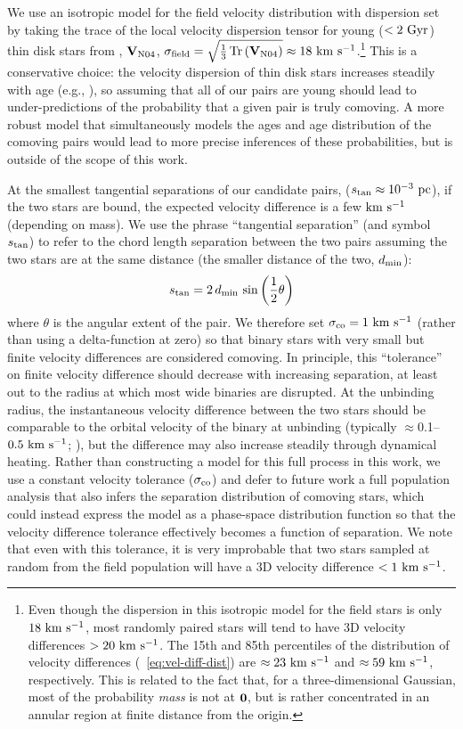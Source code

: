 \documentclass[modern, letterpaper]{aastex61}
\DeclareMathOperator{\Tr}{Tr}
\begin{document}
We use an isotropic model for the field velocity distribution with dispersion
set by taking the trace of the local velocity dispersion tensor for young
($<2~{\rm Gyr}$) thin disk stars from \citealt{Nordstrom:2004}, $\mathbf{V}_{\rm
N04}$, $\sigma_{\rm field} =
\sqrt{\frac{1}{3}\Tr{\left(\mat{V}_{\rm N04}\right)}} \approx
18~\kms$.\footnote{Even though the dispersion in this isotropic model for the
field stars is only $18~\mathrm{km}~\mathrm{s}^{-1}$, most randomly paired stars will tend to have 3D
velocity differences $>20~\mathrm{km}~\mathrm{s}^{-1}$.
The 15th and 85th percentiles of the distribution of velocity differences
(\eqname~\ref{eq:vel-diff-dist}) are $\approx 23~\mathrm{km}~\mathrm{s}^{-1}$ and $\approx 59~\mathrm{km}~\mathrm{s}^{-1}$,
respectively.
This is related to the fact that, for a three-dimensional Gaussian, most of the
probability \emph{mass} is not at $\boldsymbol{0}$, but is rather concentrated in an
annular region at finite distance from the origin.}
This is a conservative choice: the velocity dispersion of thin disk stars
increases steadily with age (e.g., \citealt{Aumer:2016}), so assuming that all
of our pairs are young should lead to under-predictions of the probability that
a given pair is truly comoving.
A more robust model that simultaneously models the ages and age distribution of
the comoving pairs would lead to more precise inferences of these probabilities,
but is outside of the scope of this work.

At the smallest tangential separations of our candidate pairs, ($s_{\rm tan}
\approx 10^{-3}~\mathrm{pc}$), if the two stars are bound, the expected velocity
difference is a few $\mathrm{km}~\mathrm{s}^{-1}$ (depending on mass).
We use the phrase ``tangential separation'' (and symbol $s_{\rm tan}$) to refer
to the chord length separation between the two pairs assuming the two stars are
at the same distance (the smaller distance of the two, $d_{\rm min}$):
\begin{equation}
    s_{\rm tan} = 2\, d_{\rm min} \, \sin{\left( \frac{1}{2}\theta \right)}
\end{equation}
where $\theta$ is the angular extent of the pair.
We therefore set $\sigma_{\rm co} = 1~\mathrm{km}~\mathrm{s}^{-1}$ (rather than using a delta-function
at zero) so that binary stars with very small but finite velocity differences
are considered comoving.
In principle, this ``tolerance'' on finite velocity difference should decrease
with increasing separation, at least out to the radius at which most wide
binaries are disrupted.
At the unbinding radius, the instantaneous velocity difference between the two
stars should be comparable to the orbital velocity of the binary at unbinding
(typically $\approx$0.1--$0.5~\mathrm{km}~\mathrm{s}^{-1}$; \citealt{Jiang:2010}), but the difference
may also increase steadily through dynamical heating.
Rather than constructing a model for this full process in this work, we use a
constant velocity tolerance ($\sigma_{\rm co}$) and defer to future work a full
population analysis that also infers the separation distribution of comoving
stars, which could instead express the model as a phase-space distribution
function so that the velocity difference tolerance effectively becomes a
function of separation.
We note that even with this tolerance, it is very improbable that two stars
sampled at random from the field population will have a 3D velocity difference
$<1~\mathrm{km}~\mathrm{s}^{-1}$.
\end{document}
